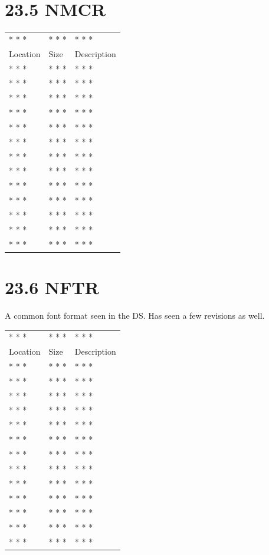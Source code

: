 \documentclass[
]{book}
\begin{document}
\hypertarget{nmcr}{%
\section{23.5 NMCR}\label{nmcr}}

\begin{longtable}[]{@{}lll@{}}
\toprule()
\endhead
* * * & * * * & * * * \\
Location & Size & Description \\
* * * & * * * & * * * \\
* * * & * * * & * * * \\
* * * & * * * & * * * \\
* * * & * * * & * * * \\
* * * & * * * & * * * \\
* * * & * * * & * * * \\
* * * & * * * & * * * \\
* * * & * * * & * * * \\
* * * & * * * & * * * \\
* * * & * * * & * * * \\
* * * & * * * & * * * \\
* * * & * * * & * * * \\
* * * & * * * & * * * \\
\bottomrule()
\end{longtable}

\hypertarget{nftr-1}{%
\section{23.6 NFTR}\label{nftr-1}}

A common font format seen in the DS. Has seen a few revisions as well.

\begin{longtable}[]{@{}lll@{}}
\toprule()
\endhead
* * * & * * * & * * * \\
Location & Size & Description \\
* * * & * * * & * * * \\
* * * & * * * & * * * \\
* * * & * * * & * * * \\
* * * & * * * & * * * \\
* * * & * * * & * * * \\
* * * & * * * & * * * \\
* * * & * * * & * * * \\
* * * & * * * & * * * \\
* * * & * * * & * * * \\
* * * & * * * & * * * \\
* * * & * * * & * * * \\
* * * & * * * & * * * \\
* * * & * * * & * * * \\
\bottomrule()
\end{longtable}
\end{document}

